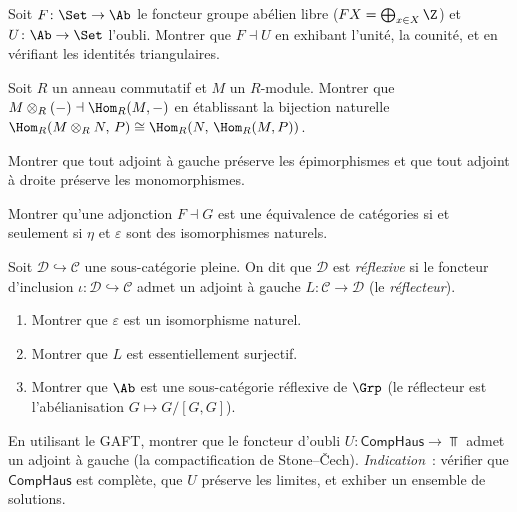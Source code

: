 \begin{exercice}\label{exo:adj-libre-ab}
Soit $F\colon\Set\to\Ab$ le foncteur \og{}groupe abélien libre\fg{}
($FX = \bigoplus_{x\in X}\Z$) et $U\colon\Ab\to\Set$ l'oubli.
Montrer que $F\dashv U$ en exhibant l'unité, la counité,
et en vérifiant les identités triangulaires.
\end{exercice}

\begin{exercice}\label{exo:adj-tensor-hom}
Soit $R$ un anneau commutatif et $M$ un $R$-module.
Montrer que $M\otimes_R(-)\dashv\Hom_R(M,-)$ en établissant
la bijection naturelle
$\Hom_R(M\otimes_R N,\,P)\cong\Hom_R(N,\,\Hom_R(M,P))$.
\end{exercice}

\begin{exercice}\label{exo:adj-preserve-epi}
Montrer que tout adjoint à gauche préserve les épimorphismes
et que tout adjoint à droite préserve les monomorphismes.
\end{exercice}

\begin{exercice}\label{exo:adj-equivalence}
Montrer qu'une adjonction $F\dashv G$ est une équivalence de catégories
si et seulement si $\eta$ et $\varepsilon$ sont des isomorphismes naturels.
\end{exercice}

\begin{exercice}\label{exo:adj-reflexive}
Soit $\mathcal{D}\hookrightarrow\mathcal{C}$ une sous-catégorie pleine.
On dit que $\mathcal{D}$ est \emph{réflexive} si le foncteur d'inclusion
$\iota\colon\mathcal{D}\hookrightarrow\mathcal{C}$ admet un adjoint à gauche
$L\colon\mathcal{C}\to\mathcal{D}$ (le \emph{réflecteur}).
\begin{enumerate}[label=(\alph*)]
\item Montrer que $\varepsilon$ est un isomorphisme naturel.
\item Montrer que $L$ est essentiellement surjectif.
\item Montrer que $\Ab$ est une sous-catégorie réflexive de $\Grp$
      (le réflecteur est l'abélianisation $G\mapsto G/[G,G]$).
\end{enumerate}
\end{exercice}

\begin{exercice}\label{exo:gaft-application}
En utilisant le GAFT, montrer que le foncteur d'oubli
$U\colon\mathsf{CompHaus}\to\Top$ admet un adjoint à gauche
(la compactification de Stone--Čech).
\emph{Indication}~: vérifier que $\mathsf{CompHaus}$ est complète,
que $U$ préserve les limites, et exhiber un ensemble de solutions.
\end{exercice}

